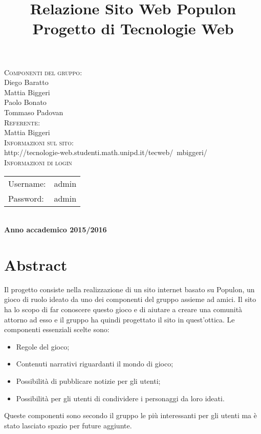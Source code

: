 \documentclass{article}
\title{Relazione Sito Web Populon \\ Progetto di Tecnologie Web} %
\begin{document}
\maketitle %

\begin{center}
\textsc{\LARGE Componenti del gruppo:}\\[0.2cm]
 Diego Baratto \\ %
Mattia Biggeri \\
Paolo Bonato \\
Tommaso Padovan \\[0.2cm]
\textsc{\LARGE Referente:}\\[0.2cm]
 Mattia Biggeri\\[0.2cm]
 \textsc{\LARGE Informazioni sul sito:}\\ [0.2cm]
http://tecnologie-web.studenti.math.unipd.it/tecweb/~mbiggeri/\\[0.2cm]
\textsc{\LARGE Informazioni di login}\\[0.2cm]

\begin{tabular}{l r} 
 Username: & admin\\
 Password: & admin\\
\end{tabular}\\[0.2cm]
\textbf{Anno accademico 2015/2016}
\end{center}


 \newpage

\section{Abstract}
	Il progetto consiste nella realizzazione di un sito internet basato su Populon, un gioco di ruolo ideato da uno dei
	componenti del gruppo assieme ad amici. Il sito ha lo scopo di far conoscere questo gioco e di aiutare a creare una comunità
	attorno ad esso e il gruppo ha quindi progettato il sito in quest'ottica. Le componenti essenziali scelte sono:
	\begin{itemize}
		\item Regole del gioco;
		\item Contenuti narrativi riguardanti il mondo di gioco;
		\item Possibilità di pubblicare notizie per gli utenti;
		\item Possibilità per gli utenti di condividere i personaggi da loro ideati.	
	\end{itemize}
	Queste componenti sono secondo il gruppo le più interessanti per gli utenti ma è stato lasciato spazio per future aggiunte.
 \newpage
\end{document}
